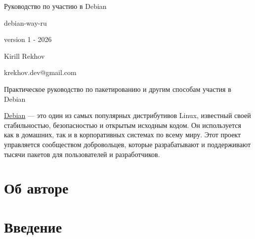 \documentclass[12pt,a4paper]{report}
\begin{document}
\hypersetup{pageanchor=false}
\begin{titlepage}
\begin{center}

\vspace*{0.5cm}
{\huge\color{cyan}
Руководство по участию в Debian\par}
\vspace{1.5cm}

{\large\color{magenta} debian-way-ru\par}
{\large version 1 - 2026\par}
\vspace{1.5cm}

{\large
Kirill Rekhov\par
krekhov.dev@gmail.com\par}
\vspace{1.5cm}

\begin{minipage}{0.80\textwidth}
\centering
{\large\color{darkgray}
Практическое руководство по пакетированию и другим способам участия в Debian\par}
\end{minipage}

\end{center}
\end{titlepage}
\hypersetup{pageanchor=true}

\href{https://www.debian.org/}{Debian} --- это один из самых популярных
дистрибутивов Linux, известный своей стабильностью, безопасностью и открытым
исходным кодом. Он используется как в домашних, так и в корпоративных системах
по всему миру. Этот проект управляется сообществом добровольцев, которые
разрабатывают и поддерживают тысячи пакетов для пользователей и разработчиков.

\vspace{-0.5cm}
\section*{Об авторе}
\vspace{-0.5cm}


\vspace{-0.5cm}
\section*{Введение}
\vspace{-0.5cm}

\end{document}

